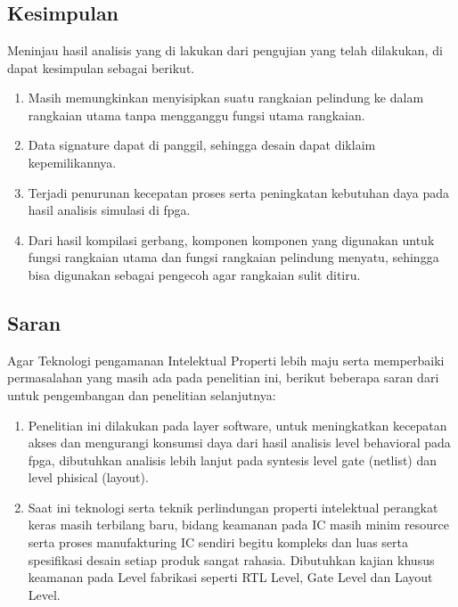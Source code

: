 % 

\chapter{\kesimpulan}

% 

\section{Kesimpulan}
Meninjau hasil analisis yang di lakukan dari pengujian yang telah dilakukan, di dapat kesimpulan sebagai berikut.

\begin{enumerate}	
	\item Masih memungkinkan menyisipkan suatu rangkaian pelindung ke dalam rangkaian utama tanpa mengganggu fungsi utama rangkaian.
	
	\item Data signature dapat di panggil, sehingga desain dapat diklaim kepemilikannya. 
	
	\item Terjadi penurunan kecepatan proses serta peningkatan kebutuhan daya pada hasil analisis simulasi di fpga.
	
	\item Dari hasil kompilasi gerbang, komponen komponen yang digunakan untuk fungsi rangkaian utama dan fungsi rangkaian pelindung menyatu, sehingga bisa digunakan sebagai pengecoh agar rangkaian sulit ditiru.
\end{enumerate}

% 

\section{Saran}
Agar Teknologi pengamanan Intelektual Properti lebih maju serta memperbaiki permasalahan yang masih ada pada penelitian ini, berikut beberapa saran dari untuk pengembangan dan penelitian selanjutnya:

\begin{enumerate}
	
	\item Penelitian ini dilakukan pada layer software, untuk meningkatkan kecepatan akses dan mengurangi konsumsi daya dari hasil analisis level behavioral pada fpga, dibutuhkan analisis lebih lanjut pada syntesis level gate (netlist) dan level phisical (layout).
	
	\item Saat ini teknologi serta teknik perlindungan properti intelektual perangkat keras masih terbilang baru, bidang keamanan pada IC masih minim resource serta proses manufakturing IC sendiri begitu kompleks dan luas serta spesifikasi desain setiap produk sangat rahasia. Dibutuhkan kajian khusus keamanan pada Level fabrikasi seperti RTL Level, Gate Level dan Layout Level.
\end{enumerate}
